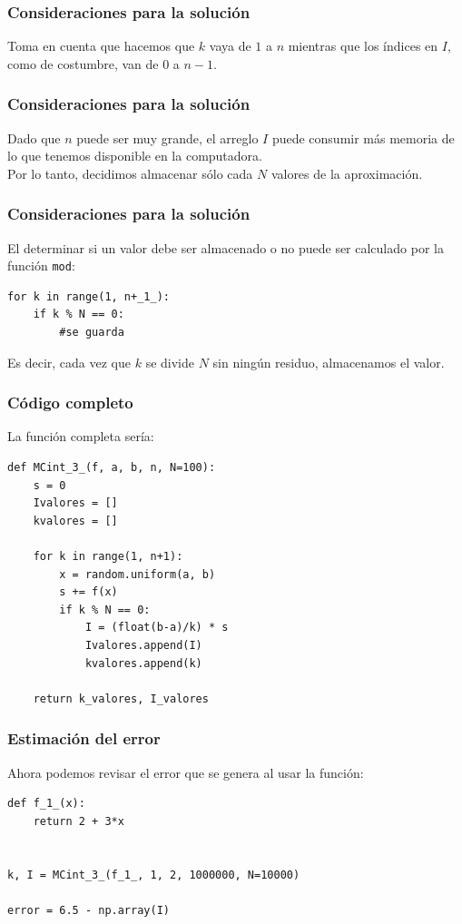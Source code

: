 \begin{frame}
\frametitle{Consideraciones para la solución}
Toma en cuenta que hacemos que $k$ vaya de $1$ a $n$ mientras que los índices en $I$, como de costumbre, van de $0$ a $n-1$.
\end{frame}
\begin{frame}
\frametitle{Consideraciones para la solución}
Dado que $n$ puede ser muy grande, el arreglo $I$ puede consumir más memoria de lo que tenemos disponible en la computadora.
\\
\bigskip
Por lo tanto, decidimos almacenar sólo cada $N$ valores de la aproximación. 
\end{frame}
\begin{frame}
\frametitle{Consideraciones para la solución}
El determinar si un valor debe ser almacenado o no puede ser calculado por la función \texttt{mod}:
\begin{lstlisting}[caption=Almacenamiento de valores, style=FormattedNumber, basicstyle=\linespread{1.1}\ttfamily=\small, columns=fullflexible]
for k in range(1, n+_1_):
    if k % N == 0:
    	#se guarda
\end{lstlisting}
Es decir, cada vez que $k$ se divide $N$ sin ningún residuo, almacenamos el valor.
\end{frame}
\begin{frame}
\frametitle{Código completo}
La función completa sería:
\begin{lstlisting}[caption=Código completo para el ejercicio, style=FormattedNumber, basicstyle=\linespread{1.1}\ttfamily=\small, columns=fullflexible]
def MCint_3_(f, a, b, n, N=100):
    s = 0
    Ivalores = []
    kvalores = []
    
    for k in range(1, n+1):
        x = random.uniform(a, b)
        s += f(x)
        if k % N == 0:
            I = (float(b-a)/k) * s
            Ivalores.append(I)
            kvalores.append(k)
    
    return k_valores, I_valores
\end{lstlisting}
\end{frame}
\begin{frame}
\frametitle{Estimación del error}
Ahora podemos revisar el error que se genera al usar la función:
\begin{lstlisting}[caption=Estimación del error del procedimiento, style=FormattedNumber, basicstyle=\linespread{1.1}\ttfamily=\small, columns=fullflexible]
def f_1_(x):
    return 2 + 3*x


k, I = MCint_3_(f_1_, 1, 2, 1000000, N=10000)

error = 6.5 - np.array(I)
\end{lstlisting}
\end{frame}
